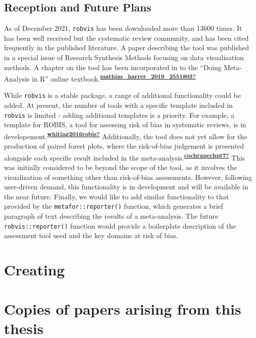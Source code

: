 \documentclass[a4paper, twoside]{templates/ociamthesis}
\newcommand*{\bibtitle}{Bibliography}
\begin{document}
\hypertarget{reception-and-future-plans-1}{%
\subsection{Reception and Future Plans}\label{reception-and-future-plans-1}}

As of December 2021, \texttt{robvis} has been downloaded more than 13600 times. It has been well received but the systematic review community, and has been cited frequently in the published literature. A paper describing the tool was published in a special issue of Research Synthesis Methods focusing on data visualisation methods. A chapter on the tool has been incorporated in to the ``Doing Meta-Analysis in R'' online textbook.\textsuperscript{\protect\hyperlink{ref-mathias_harrer_2019_2551803}{\textbf{mathias\_harrer\_2019\_2551803?}}}

While \texttt{robvis} is a stable package, a range of additional functionality could be added. At present, the number of tools with a specific template included in \texttt{robvis} is limited - adding additional templates is a priority. For example, a template for ROBIS, a tool for assessing risk of bias in systematic reviews, is in developement.\textsuperscript{\protect\hyperlink{ref-whiting2016robis}{\textbf{whiting2016robis?}}} Additionally, the tool does not yet allow for the production of paired forest plots, where the risk-of-bias judgement is presented alongside each specific result included in the meta-analysis.\textsuperscript{\protect\hyperlink{ref-cochranechpt7}{\textbf{cochranechpt7?}}} This was initially considered to be beyond the scope of the tool, as it involves the visualization of something other than risk-of-bias assessments. However, following user-driven demand, this functionality is in development and will be available in the near future. Finally, we would like to add similar functionality to that provided by the \texttt{metafor::reporter()} function, which generates a brief paragraph of text describing the results of a meta-analysis. The future \texttt{robvis::reporter()} function would provide a boilerplate description of the assessment tool used and the key domains at risk of bias.

\hypertarget{creating}{%
\section{Creating}\label{creating}}

\hypertarget{published-papers}{%
\section{Copies of papers arising from this thesis}\label{published-papers}}






\setlength{\baselineskip}{0pt} %

{\renewcommand*\MakeUppercase[1]{#1}%
\printbibliography[heading=bibintoc,title={\bibtitle}]}
\end{document}
